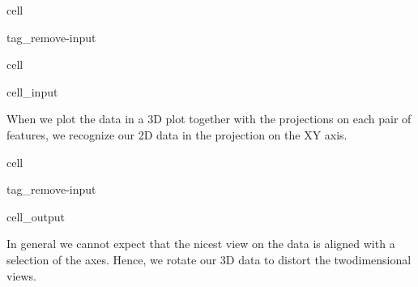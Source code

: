 \documentclass[letterpaper,10pt,english]{jupyterBook}
\begin{document}
\begin{sphinxuseclass}{cell}
\begin{sphinxuseclass}{tag_remove-input}
\end{sphinxuseclass}
\end{sphinxuseclass}
\begin{sphinxuseclass}{cell}\begin{sphinxVerbatimInput}

\begin{sphinxuseclass}{cell_input}
\begin{sphinxVerbatim}[commandchars=\\\{\}]
 
        \PYG{p}{[}\PYG{p}{]}
    \PYG{p}{[}\PYG{p}{]}  \PYG{p}{[}\PYG{p}{]}
      \PYG{p}{[}\PYG{p}{[}\PYG{p}{]}\PYG{p}{]}    
      

   
\end{sphinxVerbatim}

\end{sphinxuseclass}\end{sphinxVerbatimInput}

\end{sphinxuseclass}
\sphinxAtStartPar
When we plot the data in a 3D plot together with the projections on each pair of features, we recognize our 2D data in the projection on the X\sphinxhyphen{}Y axis.

\begin{sphinxuseclass}{cell}
\begin{sphinxuseclass}{tag_remove-input}\begin{sphinxVerbatimOutput}

\begin{sphinxuseclass}{cell_output}
\noindent{}

\end{sphinxuseclass}\end{sphinxVerbatimOutput}

\end{sphinxuseclass}
\end{sphinxuseclass}
\sphinxAtStartPar
In general we cannot expect that the nicest view on the data is aligned with a selection of the axes. Hence, we rotate our 3D data to distort the two\sphinxhyphen{}dimensional views.
\end{document}
